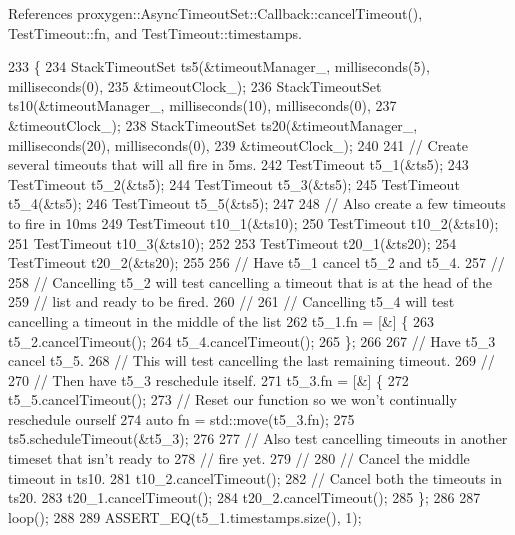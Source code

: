 References proxygen\+::\+Async\+Timeout\+Set\+::\+Callback\+::cancel\+Timeout(), Test\+Timeout\+::fn, and Test\+Timeout\+::timestamps.


\begin{DoxyCode}
233                                    \{
234   StackTimeoutSet ts5(&timeoutManager\_, milliseconds(5), milliseconds(0),
235                       &timeoutClock\_);
236   StackTimeoutSet ts10(&timeoutManager\_, milliseconds(10), milliseconds(0),
237                        &timeoutClock\_);
238   StackTimeoutSet ts20(&timeoutManager\_, milliseconds(20), milliseconds(0),
239                        &timeoutClock\_);
240 
241   \textcolor{comment}{// Create several timeouts that will all fire in 5ms.}
242   TestTimeout t5\_1(&ts5);
243   TestTimeout t5\_2(&ts5);
244   TestTimeout t5\_3(&ts5);
245   TestTimeout t5\_4(&ts5);
246   TestTimeout t5\_5(&ts5);
247 
248   \textcolor{comment}{// Also create a few timeouts to fire in 10ms}
249   TestTimeout t10\_1(&ts10);
250   TestTimeout t10\_2(&ts10);
251   TestTimeout t10\_3(&ts10);
252 
253   TestTimeout t20\_1(&ts20);
254   TestTimeout t20\_2(&ts20);
255 
256   \textcolor{comment}{// Have t5\_1 cancel t5\_2 and t5\_4.}
257   \textcolor{comment}{//}
258   \textcolor{comment}{// Cancelling t5\_2 will test cancelling a timeout that is at the head of the}
259   \textcolor{comment}{// list and ready to be fired.}
260   \textcolor{comment}{//}
261   \textcolor{comment}{// Cancelling t5\_4 will test cancelling a timeout in the middle of the list}
262   t5\_1.fn = [&] \{
263     t5\_2.cancelTimeout();
264     t5\_4.cancelTimeout();
265   \};
266 
267   \textcolor{comment}{// Have t5\_3 cancel t5\_5.}
268   \textcolor{comment}{// This will test cancelling the last remaining timeout.}
269   \textcolor{comment}{//}
270   \textcolor{comment}{// Then have t5\_3 reschedule itself.}
271   t5\_3.fn = [&] \{
272     t5\_5.cancelTimeout();
273     \textcolor{comment}{// Reset our function so we won't continually reschedule ourself}
274     \textcolor{keyword}{auto} fn = std::move(t5\_3.fn);
275     ts5.scheduleTimeout(&t5\_3);
276 
277     \textcolor{comment}{// Also test cancelling timeouts in another timeset that isn't ready to}
278     \textcolor{comment}{// fire yet.}
279     \textcolor{comment}{//}
280     \textcolor{comment}{// Cancel the middle timeout in ts10.}
281     t10\_2.cancelTimeout();
282     \textcolor{comment}{// Cancel both the timeouts in ts20.}
283     t20\_1.cancelTimeout();
284     t20\_2.cancelTimeout();
285   \};
286 
287   loop();
288 
289   ASSERT\_EQ(t5\_1.timestamps.size(), 1);

\end{DoxyCode}
